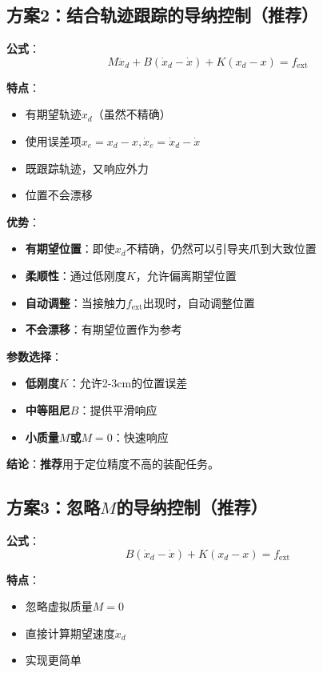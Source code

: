 \documentclass[12pt,a4paper]{article}
\begin{document}
\subsection{方案2：结合轨迹跟踪的导纳控制（推荐）}

\textbf{公式}：
\begin{equation}
M\ddot{x}_d + B(\dot{x}_d - \dot{x}) + K(x_d - x) = f_{\text{ext}} \tag{*}
\end{equation}

\textbf{特点}：
\begin{itemize}
\item 有期望轨迹$x_d$（虽然不精确）
\item 使用误差项$x_e = x_d - x, \dot{x}_e = \dot{x}_d - \dot{x}$
\item 既跟踪轨迹，又响应外力
\item 位置不会漂移
\end{itemize}

\textbf{优势}：
\begin{itemize}
\item \textbf{有期望位置}：即使$x_d$不精确，仍然可以引导夹爪到大致位置
\item \textbf{柔顺性}：通过低刚度$K$，允许偏离期望位置
\item \textbf{自动调整}：当接触力$f_{\text{ext}}$出现时，自动调整位置
\item \textbf{不会漂移}：有期望位置作为参考
\end{itemize}

\textbf{参数选择}：
\begin{itemize}
\item \textbf{低刚度$K$}：允许2-3cm的位置误差
\item \textbf{中等阻尼$B$}：提供平滑响应
\item \textbf{小质量$M$或$M = 0$}：快速响应
\end{itemize}

\textbf{结论}：\textbf{推荐}用于定位精度不高的装配任务。

\subsection{方案3：忽略$M$的导纳控制（推荐）}

\textbf{公式}：
\begin{equation}
B(\dot{x}_d - \dot{x}) + K(x_d - x) = f_{\text{ext}} \tag{**}
\end{equation}

\textbf{特点}：
\begin{itemize}
\item 忽略虚拟质量$M = 0$
\item 直接计算期望速度$\dot{x}_d$
\item 实现更简单
\end{itemize}
\end{document}
